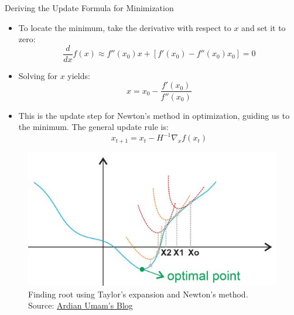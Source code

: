 \documentclass[serif, aspectratio=169]{beamer}
\begin{document}
\begin{frame}{Deriving the Update Formula for Minimization}
\begin{minipage}{0.7\linewidth}
    \begin{itemize}
        \item To locate the minimum, take the derivative with respect to \( x \) and set it to zero:
        \[
        \frac{d}{dx} f(x) \approx f''(x_0)x + [f'(x_0) - f''(x_0)x_0] = 0
        \]
        \item Solving for \( x \) yields:
        \[
        x = x_0 - \frac{f'(x_0)}{f''(x_0)}
        \]
        \item This is the update step for Newton’s method in optimization, guiding us to the minimum. The general update rule is:
        \[
        x_{t+1} = x_t - H^{-1} \nabla_x f(x_t)
        \]
    \end{itemize}
\end{minipage}%
\begin{minipage}{0.3\linewidth}
    \begin{figure}
        \centering
        \includegraphics[width=1.2\linewidth]{pic/newton_ardianumam.jpg}
        \caption{\footnotesize Finding root using Taylor's expansion and Newton's method. Source: \href{https://ardianumam.wordpress.com}{Ardian Umam's Blog}}
    \end{figure}
\end{minipage}
\end{frame}
\end{document}
